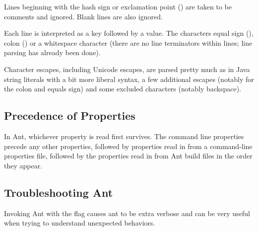 Lines beginning with the hash sign \code{\#} or exclamation point
(\code{!}) are taken to be comments and ignored.  Blank lines are also
ignored.

Each line is interpreted as a key followed by a value.  The characters
equal sign (\code{=}), colon (\code{:}) or a whitespace character
(there are no line terminators within lines; line parsing has already
been done).

Character escapes, including Unicode escapes, are parsed pretty much
as in Java string literals with a bit
more liberal syntax, a few additional escapes (notably for the colon
and equals sign) and some excluded characters (notably backspace).


\subsection{Precedence of Properties}

In Ant, whichever property is read first survives.  The command
line properties precede any other properties, followed by properties
read in from a command-line properties file, followed by the
properties read in from Ant build files in the order they appear.

\subsection{Troubleshooting Ant}

Invoking Ant with the  flag causes ant to be extra verbose and can be
very useful when trying to understand unexpected behaviors.


